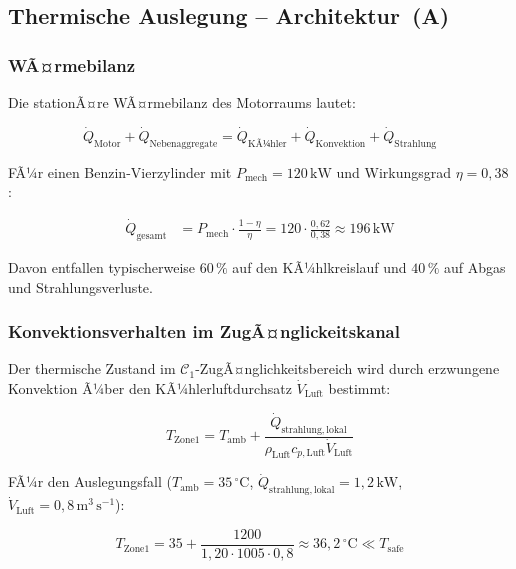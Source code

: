 ﻿\documentclass[12pt,a4paper]{article}
\begin{document}
\subsection{Thermische Auslegung -- Architektur~(A)}

\subsubsection{WÃ¤rmebilanz}

Die stationÃ¤re WÃ¤rmebilanz des Motorraums lautet:

\begin{equation}
	\dot{Q}_\mathrm{Motor} + \dot{Q}_\mathrm{Nebenaggregate}
	= \dot{Q}_\mathrm{KÃ¼hler} + \dot{Q}_\mathrm{Konvektion}
	+ \dot{Q}_\mathrm{Strahlung}
	\label{eq:waermebilanz_a}
\end{equation}

FÃ¼r einen Benzin-Vierzylinder mit $P_\mathrm{mech} = 120\,\mathrm{kW}$ und
Wirkungsgrad $\eta = 0{,}38$:

\begin{align}
	\dot{Q}_\mathrm{gesamt} &= P_\mathrm{mech} \cdot \frac{1 - \eta}{\eta}
	= 120 \cdot \frac{0{,}62}{0{,}38} \approx 196\,\mathrm{kW}
	\label{eq:waerme_benzin}
\end{align}

Davon entfallen typischerweise $60\,\%$ auf den KÃ¼hlkreislauf und
$40\,\%$ auf Abgas und Strahlungsverluste.

\subsubsection{Konvektionsverhalten im ZugÃ¤nglickeitskanal}

Der thermische Zustand im $\mathcal{C}_1$-ZugÃ¤nglichkeitsbereich wird durch
erzwungene Konvektion Ã¼ber den KÃ¼hlerluftdurchsatz $\dot{V}_\mathrm{Luft}$ bestimmt:

\begin{equation}
	T_\mathrm{Zone1} = T_\mathrm{amb} + \frac{\dot{Q}_\mathrm{strahlung,lokal}}
	{\rho_\mathrm{Luft} c_{p,\mathrm{Luft}} \dot{V}_\mathrm{Luft}}
	\label{eq:temp_zone1}
\end{equation}

FÃ¼r den Auslegungsfall ($T_\mathrm{amb} = 35\,^\circ\mathrm{C}$,
$\dot{Q}_\mathrm{strahlung,lokal} = 1{,}2\,\mathrm{kW}$,
$\dot{V}_\mathrm{Luft} = 0{,}8\,\mathrm{m^3\,s^{-1}}$):

\begin{equation}
	T_\mathrm{Zone1} = 35 + \frac{1200}{1{,}20 \cdot 1005 \cdot 0{,}8}
	\approx 36{,}2\,^\circ\mathrm{C} \ll T_\mathrm{safe}
	\label{eq:temp_zone1_num}
\end{equation}
\end{document}
